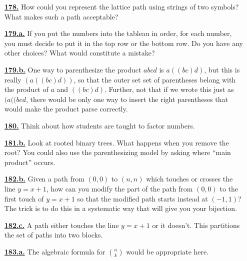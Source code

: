 \documentclass[10pt,]{book}
\theoremstyle{plain}
\theoremstyle{definition}
\theoremstyle{definition}
\theoremstyle{definition}
\numberwithin{equation}{chapter}
\begin{document}
\begin{itemize}[itemsep=1em]
\hypertarget{a-178}{}\item[\textbf{\hyperref[act-pathshdseq]{178.}}]
\hypertarget{p-1012}{}%
How could you represent the lattice path using strings of two symbols?  What makes such a path acceptable?%

\hypertarget{a-179.a}{}\item[\textbf{\hyperref[task-189]{179.a.}}]
\hypertarget{p-1016}{}%
If you put the numbers into the tableau in order, for each number, you must decide to put it in the top row or the bottom row.  Do you have any other choices?  What would constitute a mistake?%

\hypertarget{a-179.b}{}\item[\textbf{\hyperref[task-190]{179.b.}}]
\hypertarget{p-1018}{}%
One way to parenthesize the product \(abcd\) is \(a((bc)d)\), but this is really \((a((bc)d))\), so that the outer set set of parentheses belong with the product of \(a\) and \(((bc)d)\).  Further, not that if we wrote this just as \((a((bcd\), there would be only one way to insert the right parentheses that would make the product parse correctly.%

\hypertarget{a-180}{}\item[\textbf{\hyperref[activity-173]{180.}}]
\hypertarget{p-1021}{}%
Think about how students are taught to factor numbers.%

\hypertarget{a-181.b}{}\item[\textbf{\hyperref[task-192]{181.b.}}]
\hypertarget{p-1026}{}%
Look at rooted binary trees.  What happens when you remove the root?  You could also use the parenthesizing model by asking where ``main product'' occurs.%

\hypertarget{a-182.b}{}\item[\textbf{\hyperref[task-195]{182.b.}}]
\hypertarget{p-1033}{}%
Given a path from \((0, 0)\) to \((n, n)\) which touches or crosses the line \(y = x + 1\), how can you modify the part of the path from \((0, 0)\) to the first touch of \(y = x + 1\) so that the modified path starts instead at \((-1, 1)\)? The trick is to do this in a systematic way that will give you your bijection.%

\hypertarget{a-182.c}{}\item[\textbf{\hyperref[task-196]{182.c.}}]
\hypertarget{p-1036}{}%
A path either touches the line \(y = x + 1\) or it doesn't. This partitions the set of paths into two blocks.%

\hypertarget{a-183.a}{}\item[\textbf{\hyperref[task-197]{183.a.}}]
\hypertarget{p-1040}{}%
The algebraic formula for \(\binom{n}{k}\) would be appropriate here.%


\end{itemize}
\end{document}
